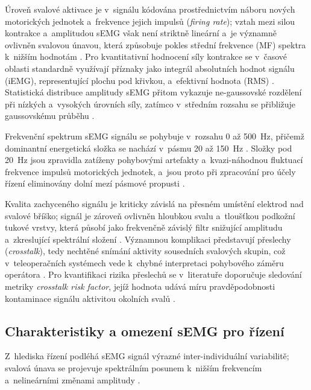 \documentclass[FZS,DP]{tulthesis}
\begin{document}
Úroveň svalové aktivace je v~signálu kódována prostřednictvím náboru nových motorických jednotek a~frekvence jejich impulsů (\textit{firing rate}); vztah mezi silou kontrakce a~amplitudou sEMG však není striktně lineární a~je významně ovlivněn svalovou únavou, která způsobuje pokles střední frekvence (MF) spektra k~nižším hodnotám \cite{Chowdhury2013917, Reaz2006, Stuchla2024}.
Pro kvantitativní hodnocení síly kontrakce se v~časové oblasti standardně využívají příznaky jako integrál absolutních hodnot signálu (iEMG), representující plochu pod křivkou, a~efektivní hodnota (RMS) \cite{Wu2024613, Chowdhury2013917}.
Statistická distribuce amplitudy sEMG přitom vykazuje ne-gaussovské rozdělení při nízkých a~vysokých úrovních síly, zatímco v~středním rozsahu se přibližuje gaussovskému průběhu \cite{Chowdhury2013917}.

Frekvenční spektrum sEMG signálu se pohybuje v~rozsahu 0 až 500~Hz, přičemž dominantní energetická složka se nachází v~pásmu 20 až 150~Hz \cite{Reaz2006, Sul2025627, Wu2024613}.
Složky pod 20~Hz jsou zpravidla zatíženy pohybovými artefakty a~kvazi-náhodnou fluktuací frekvence impulsů motorických jednotek, a~jsou proto při zpracování pro účely řízení eliminovány dolní mezí pásmové propusti \cite{Chowdhury2013917, DeLuca2010, Reaz2006}.

Kvalita zachyceného signálu je kriticky závislá na přesném umístění elektrod nad svalové bříško; signál je zároveň ovlivněn hloubkou svalu a~tloušťkou podkožní tukové vrstvy, která působí jako frekvenčně závislý filtr snižující amplitudu a~zkreslující spektrální složení \cite{ALCAN20231026, Chowdhury2013917, Reaz2006}.
Významnou komplikaci představují přeslechy (\textit{crosstalk}), tedy nechtěné snímání aktivity sousedních svalových skupin, což v~teleoperačních systémech vede k~chybné interpretaci pohybového záměru operátora \cite{Chowdhury2013917, DeLuca2010, Sul2025627}.
Pro kvantifikaci rizika přeslechů se v~literatuře doporučuje sledování metriky \textit{crosstalk risk factor}, jejíž hodnota udává míru pravděpodobnosti kontaminace signálu aktivitou okolních svalů \cite{Wu2024613}.

\subsection{Charakteristiky a omezení sEMG pro řízení}
Z~hlediska řízení podléhá sEMG signál výrazné inter-individuální variabilitě; svalová únava se projevuje spektrálním posunem k~nižším frekvencím a~nelineárními změnami amplitudy \cite{ALCAN20231026, Lee20241121, Wu2024613}.
\end{document}
